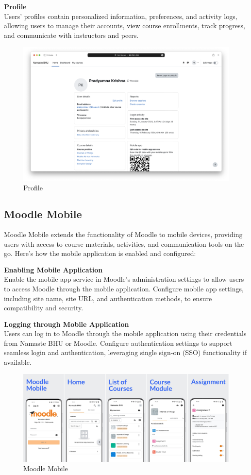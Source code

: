 \textbf{Profile}\\
Users' profiles contain personalized information, preferences, and activity logs, allowing users to manage their accounts, view course enrollments, track progress, and communicate with instructors and peers.

\begin{figure}[h]
    \centering
    \includegraphics[width=0.75\linewidth]{assets/img/profile.png}
    \caption{Profile}
    \label{fig:profile}
\end{figure}

\subsection{Moodle Mobile}

Moodle Mobile extends the functionality of Moodle to mobile devices, providing users with access to course materials, activities, and communication tools on the go. Here's how the mobile application is enabled and configured:

\textbf{Enabling Mobile Application}\\
Enable the mobile app service in Moodle's administration settings to allow users to access Moodle through the mobile application. Configure mobile app settings, including site name, site URL, and authentication methods, to ensure compatibility and security.

\textbf{Logging through Mobile Application}\\
Users can log in to Moodle through the mobile application using their credentials from Namaste BHU or Moodle. Configure authentication settings to support seamless login and authentication, leveraging single sign-on (SSO) functionality if available.

\begin{figure}[h]
    \centering
    \includegraphics[width=\linewidth]{assets/img/moodle-mobile-opt.jpg}
    \caption{Moodle Mobile}
    \label{fig:moodle-mobile}
\end{figure}

